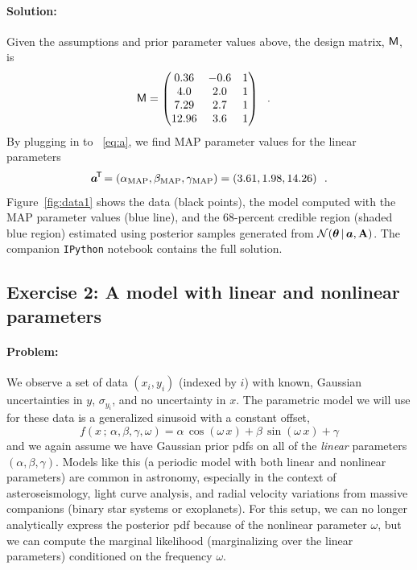 \paragraph{Solution:} Given the assumptions and prior parameter values
above, the design matrix, $\mathsf{M}$, is
\begin{align}
  \mathsf{M} &= \begin{pmatrix}
      0.36 & -0.6 & 1\\
      4.0 & 2.0 & 1\\
      7.29 & 2.7 & 1\\
      12.96 & 3.6 & 1
    \end{pmatrix} ~~.
\end{align}
By plugging in to \equationname~\ref{eq:a}, we find MAP parameter values for the
linear parameters
\begin{equation}
  \boldsymbol{a}^{\!\mathsf{T}\!} =
    (\alpha_{\rm MAP}, \beta_{\rm MAP}, \gamma_{\rm MAP}) =
      (3.61, 1.98, 14.26) ~~.
\end{equation}
Figure~\ref{fig:data1} shows the data (black points), the model computed with
the MAP parameter values (blue line), and the 68-percent credible region (shaded
blue region) estimated using posterior samples generated from
$\mathcal{N}\!\,(\boldsymbol{\theta}\,|\,\boldsymbol{a},\mathbf{A})$.
The companion \texttt{IPython} notebook contains the full solution.


\subsection{Exercise 2: A model with linear and nonlinear parameters}

\paragraph{Problem:} We observe a set of data $(x_i, y_i)$ (indexed by $i$) with
known, Gaussian uncertainties in $y$, $\sigma_{y_i}$, and no uncertainty in $x$.
The parametric model we will use for these data is a generalized sinusoid with a
constant offset,
\begin{equation}
  f(x \,;\, \alpha, \beta, \gamma, \omega) =
    \alpha\,\cos(\omega \, x) + \beta\,\sin(\omega \, x) + \gamma \label{eq:ex2model}
\end{equation}
and we again assume we have Gaussian prior pdfs on all of the \emph{linear}
parameters $(\alpha, \beta, \gamma)$.
Models like this (a periodic model with both linear and nonlinear parameters)
are common in astronomy, especially in the context of asteroseismology, light
curve analysis, and radial velocity variations from massive companions (binary
star systems or exoplanets).
For this setup, we can no longer analytically express the posterior pdf because
of the nonlinear parameter $\omega$, but we can compute the marginal likelihood
(marginalizing over the linear parameters) conditioned on the frequency
$\omega$.

